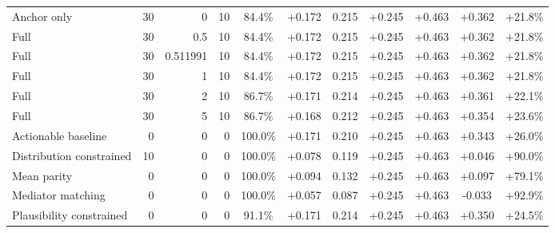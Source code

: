 \begin{table}[htbp]
\begin{tabular}{lrrrccccccc}
Anchor only & 30 & 0 & 10 & 84.4\% & +0.172 & 0.215 & +0.245 & +0.463 & +0.362 & +21.8\% \\
Full & 30 & 0.5 & 10 & 84.4\% & +0.172 & 0.215 & +0.245 & +0.463 & +0.362 & +21.8\% \\
Full & 30 & 0.511991 & 10 & 84.4\% & +0.172 & 0.215 & +0.245 & +0.463 & +0.362 & +21.8\% \\
Full & 30 & 1 & 10 & 84.4\% & +0.172 & 0.215 & +0.245 & +0.463 & +0.362 & +21.8\% \\
Full & 30 & 2 & 10 & 86.7\% & +0.171 & 0.214 & +0.245 & +0.463 & +0.361 & +22.1\% \\
Full & 30 & 5 & 10 & 86.7\% & +0.168 & 0.212 & +0.245 & +0.463 & +0.354 & +23.6\% \\
Actionable baseline & 0 & 0 & 0 & 100.0\% & +0.171 & 0.210 & +0.245 & +0.463 & +0.343 & +26.0\% \\
Distribution constrained & 10 & 0 & 0 & 100.0\% & +0.078 & 0.119 & +0.245 & +0.463 & +0.046 & +90.0\% \\
Mean parity & 0 & 0 & 0 & 100.0\% & +0.094 & 0.132 & +0.245 & +0.463 & +0.097 & +79.1\% \\
Mediator matching & 0 & 0 & 0 & 100.0\% & +0.057 & 0.087 & +0.245 & +0.463 & -0.033 & +92.9\% \\
Plausibility constrained & 0 & 0 & 0 & 91.1\% & +0.171 & 0.214 & +0.245 & +0.463 & +0.350 & +24.5\% \\
\bottomrule
\end{tabular}
\end{table}